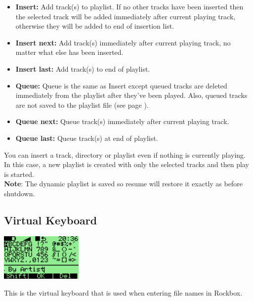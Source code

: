 \begin{itemize}
\item \textbf{Insert:} Add track(s) to playlist. If no other tracks have been inserted then the selected track will be added immediately after current playing track, otherwise they will be added to end of insertion list.
\item \textbf{Insert next: }Add track(s) immediately after current playing track, no matter what else has been inserted.
\item \textbf{Insert last: }Add track(s) to end of playlist.
\item \textbf{Queue: } Queue is the same as Insert except queued tracks are deleted immediately from the playlist after they've been played. Also, queued tracks are not saved to the playlist file (see page \pageref{ref:playlistoptions}).
\item \textbf{Queue next:} Queue track(s) immediately after current playing track.
\item \textbf{Queue last: }Queue track(s) at end of playlist.
\end{itemize}

You can insert a track, directory or playlist even if nothing is currently playing. In this case, a new playlist is created with only the selected tracks and then play is started.\\
\textbf{Note}: The dynamic playlist is saved so resume will restore it exactly as before shutdown.

\subsection{Virtual Keyboard}
\begin{center}
  \includegraphics[width=4cm]{rockbox_interface/images/ss-virtual-keyboard-112x64x1.png}
\end{center}
This is the virtual keyboard that is used when entering file names in Rockbox.

